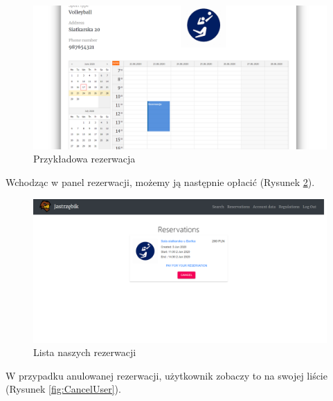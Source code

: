 \documentclass[a4paper,11pt]{article}
\begin{document}
    \begin{figure}[H] 
    	\begin{center}
    		\includegraphics[width=1\textwidth]{img3/Reservation.png}
            \caption{Przykładowa rezerwacja}
            \label{fig:Res}
    	\end{center}
    \end{figure}  

    Wchodząc w panel rezerwacji, możemy ją następnie opłacić (Rysunek \ref{fig:Res2}).
    
    \begin{figure}[H] 
    	\begin{center}
    		\includegraphics[width=1\textwidth]{img3/Reservations.png}
            \caption{Lista naszych rezerwacji}
            \label{fig:Res2}
    	\end{center}
    \end{figure}  
    
    W przypadku anulowanej rezerwacji, użytkownik zobaczy to na swojej liście (Rysunek \ref{fig:CancelUser}).
        
\end{document}
